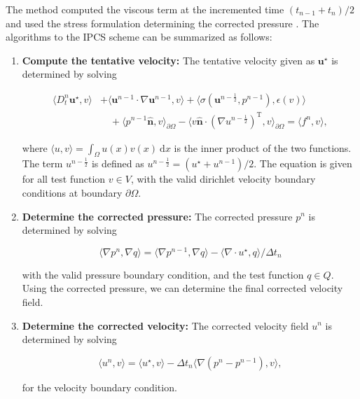 The method computed the viscous term at the incremented time $(t_{n-1} + t_n)/2$ and used the stress formulation determining the corrected pressure \cite{Logg2012a}. The algorithms to the IPCS scheme can be summarized as follows:

	\begin{enumerate}
	\item \textbf{Compute the tentative velocity:} The tentative velocity given as $\mathbf{u}^{\star}$ is determined by solving
	
		\begin{equation}
		\begin{split}
		\langle D_t^n \mathbf{u}^{\star}, v \rangle &+ \langle \mathbf{u}^{n-1}\cdot\nabla\mathbf{u}^{n-1},v\rangle + \langle \sigma(\mathbf{u}^{n-\frac{1}{2}},p^{n-1}), \epsilon(v) \rangle \quad \\ &\quad+ \langle p^{n-1}\hat{\mathbf{n}},v\rangle_{\partial \Omega} - \langle v\hat{\mathbf{n}} \cdot (\nabla u^{n-\frac{1}{2}} )^{\mathrm{T}},v \rangle_{\partial \Omega} = \langle f^n,v \rangle,
		\end{split}
		\end{equation}
		
	where $\langle u,v \rangle = \int_{\Omega} u(x)v(x)\ \mathrm{d}x$ is the inner product of the two functions. The term $u^{n-\frac{1}{2}}$ is defined as $u^{n-\frac{1}{2}} = (u^{\star}+u^{n-1})/2$. The equation is given for all test function $v \in V$, with the valid dirichlet velocity boundary conditions at boundary $\partial \Omega$.
	
	\item \textbf{Determine the corrected pressure:} The corrected pressure $p^n$ is determined by solving
	
		\begin{equation}
		\langle \nabla p^n, \nabla q \rangle = \langle \nabla p^{n-1}, \nabla q\rangle - \langle \nabla \cdot u^{\star}, q \rangle / \Delta t_n
		\end{equation}
	
	with the valid pressure boundary condition, and the test function $q \in Q$. Using the corrected pressure, we can determine the final corrected velocity field. 
		
	\item \textbf{Determine the corrected velocity:} The corrected velocity field $u^n$ is determined by solving
	
		\begin{equation}
		\langle u^n, v\rangle = \langle u^{\star},v \rangle - \Delta t_n \langle \nabla(p^n - p^{n-1}),v \rangle,
		\end{equation}
		
	for the velocity boundary condition.
		
	\end{enumerate}
	
